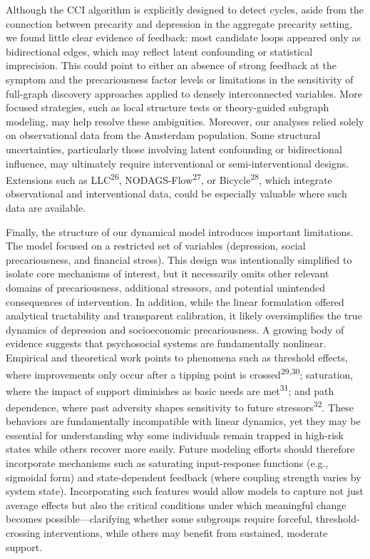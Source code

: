 \documentclass[
]{article}
\begin{document}
Although the CCI algorithm is explicitly designed to detect cycles,
aside from the connection between precarity and depression in the
aggregate precarity setting, we found little clear evidence of feedback:
most candidate loops appeared only as bidirectional edges, which may
reflect latent confounding or statistical imprecision. This could point
to either an absence of strong feedback at the symptom and the
precariousness factor levels or limitations in the sensitivity of
full-graph discovery approaches applied to densely interconnected
variables. More focused strategies, such as local structure tests or
theory-guided subgraph modeling, may help resolve these ambiguities.
Moreover, our analyses relied solely on observational data from the
Amsterdam population. Some structural uncertainties, particularly those
involving latent confounding or bidirectional influence, may ultimately
require interventional or semi-interventional designs. Extensions such
as LLC\textsuperscript{26}, NODAGS-Flow\textsuperscript{27}, or
Bicycle\textsuperscript{28}, which integrate observational and
interventional data, could be especially valuable where such data are
available.

Finally, the structure of our dynamical model introduces important
limitations. The model focused on a restricted set of variables
(depression, social precariousness, and financial stress). This design
was intentionally simplified to isolate core mechanisms of interest, but
it necessarily omits other relevant domains of precariousness,
additional stressors, and potential unintended consequences of
intervention. In addition, while the linear formulation offered
analytical tractability and transparent calibration, it likely
oversimplifies the true dynamics of depression and socioeconomic
precariousness. A growing body of evidence suggests that psychosocial
systems are fundamentally nonlinear. Empirical and theoretical work
points to phenomena such as threshold effects, where improvements only
occur after a tipping point is crossed\textsuperscript{29,30};
saturation, where the impact of support diminishes as basic needs are
met\textsuperscript{31}; and path dependence, where past adversity
shapes sensitivity to future stressors\textsuperscript{32}. These
behaviors are fundamentally incompatible with linear dynamics, yet they
may be essential for understanding why some individuals remain trapped
in high-risk states while others recover more easily. Future modeling
efforts should therefore incorporate mechanisms such as saturating
input-response functions (e.g., sigmoidal form) and state-dependent
feedback (where coupling strength varies by system state). Incorporating
such features would allow models to capture not just average effects but
also the critical conditions under which meaningful change becomes
possible---clarifying whether some subgroups require forceful,
threshold-crossing interventions, while others may benefit from
sustained, moderate support.
\end{document}
